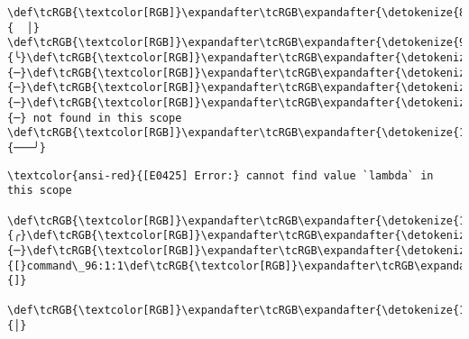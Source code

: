 \documentclass[11pt]{article}
\begin{document}
\begin{Verbatim}[commandchars=\\\{\}, frame=single, framerule=2mm, rulecolor=\color{outerrorbackground}]
 \def\tcRGB{\textcolor[RGB]}\expandafter\tcRGB\expandafter{\detokenize{88,88,88}}{  │}                                    \def\tcRGB{\textcolor[RGB]}\expandafter\tcRGB\expandafter{\detokenize{95,0,135}}{╰}\def\tcRGB{\textcolor[RGB]}\expandafter\tcRGB\expandafter{\detokenize{95,0,135}}{─}\def\tcRGB{\textcolor[RGB]}\expandafter\tcRGB\expandafter{\detokenize{95,0,135}}{─}\def\tcRGB{\textcolor[RGB]}\expandafter\tcRGB\expandafter{\detokenize{95,0,135}}{─}\def\tcRGB{\textcolor[RGB]}\expandafter\tcRGB\expandafter{\detokenize{95,0,135}}{─} not found in this scope
\def\tcRGB{\textcolor[RGB]}\expandafter\tcRGB\expandafter{\detokenize{148,148,148}}{───╯}
    \end{Verbatim}

    \begin{Verbatim}[commandchars=\\\{\}, frame=single, framerule=2mm, rulecolor=\color{outerrorbackground}]
\textcolor{ansi-red}{[E0425] Error:} cannot find value `lambda` in this scope
   \def\tcRGB{\textcolor[RGB]}\expandafter\tcRGB\expandafter{\detokenize{148,148,148}}{╭}\def\tcRGB{\textcolor[RGB]}\expandafter\tcRGB\expandafter{\detokenize{148,148,148}}{─}\def\tcRGB{\textcolor[RGB]}\expandafter\tcRGB\expandafter{\detokenize{148,148,148}}{[}command\_96:1:1\def\tcRGB{\textcolor[RGB]}\expandafter\tcRGB\expandafter{\detokenize{148,148,148}}{]}
   \def\tcRGB{\textcolor[RGB]}\expandafter\tcRGB\expandafter{\detokenize{148,148,148}}{│}

\end{Verbatim}
\end{document}

